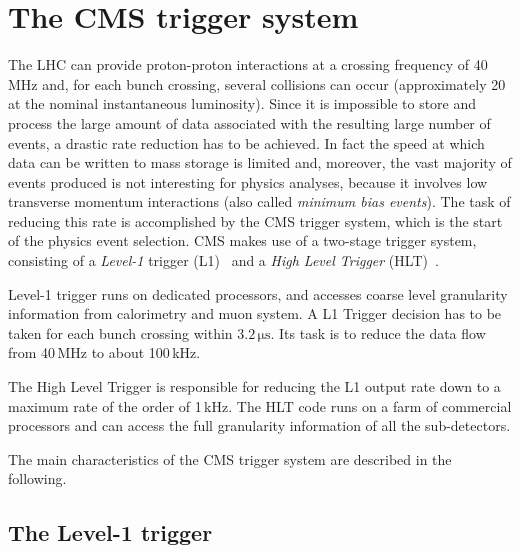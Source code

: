 \section{The CMS trigger system}
\label{sec:Trigger}

The LHC can provide proton-proton interactions at a crossing frequency of 40\,MHz and, for each bunch crossing, several collisions can occur (approximately 20 at the nominal instantaneous luminosity). Since it is impossible to store and process the large amount of data associated with the resulting large number of events, a drastic rate reduction has to be achieved. In fact the speed at which data can be written to mass storage is limited and, moreover, the vast majority of events produced is not interesting for physics analyses, because it involves low transverse momentum interactions (also called \emph{minimum bias events}). The task of reducing this rate is accomplished by the CMS trigger system, which is the start of the physics event selection. CMS makes use of a two-stage trigger system, consisting of a \emph{Level-1} trigger (L1)~\cite{Dasu:2000ge} and a \emph{High Level Trigger} (HLT)~\cite{Cittolin:578006}.

Level-1 trigger runs on dedicated processors, and accesses coarse level granularity information from calorimetry and muon system. A L1 Trigger decision has to be taken for each bunch crossing within $3.2\,\mathrm{\mu s}$. Its task is to reduce the data flow from 40\,MHz to about 100\,kHz.

The High Level Trigger is responsible for reducing the L1 output rate down to a maximum rate of the order of 1\,kHz. The HLT code runs on a farm of commercial processors and can access the full granularity information of all the sub-detectors.

The main characteristics of the CMS trigger system are described in the following.

\subsection{The Level-1 trigger}

